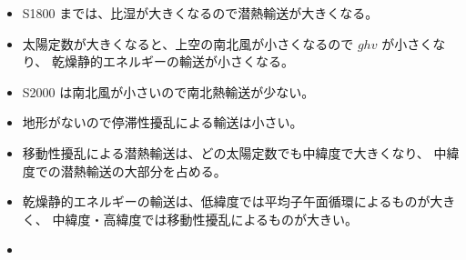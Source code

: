 \documentclass[body]{subfiles}
\begin{document}
\begin{itemize}
	\item S1800 までは、比湿が大きくなるので潜熱輸送が大きくなる。
	\item 太陽定数が大きくなると、上空の南北風が小さくなるので \(ghv\) が小さくなり、
		乾燥静的エネルギーの輸送が小さくなる。
	\item S2000 は南北風が小さいので南北熱輸送が少ない。
	\item 地形がないので停滞性擾乱による輸送は小さい。
	\item 移動性擾乱による潜熱輸送は、どの太陽定数でも中緯度で大きくなり、
		中緯度での潜熱輸送の大部分を占める。
	\item 乾燥静的エネルギーの輸送は、低緯度では平均子午面循環によるものが大きく、
		中緯度・高緯度では移動性擾乱によるものが大きい。
\end{itemize}

\begin{itemize}
	\item 
\end{itemize}
\end{document}

